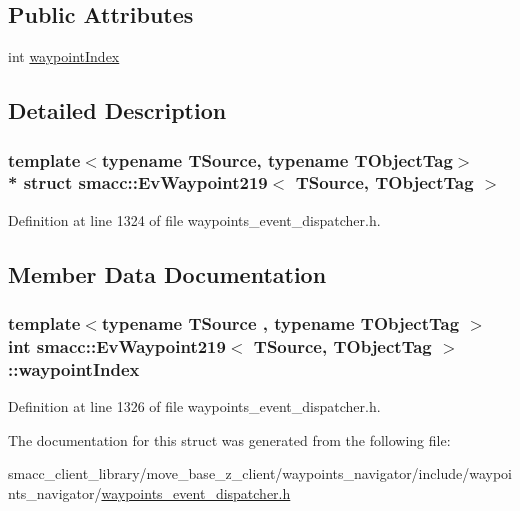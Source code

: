 \subsection*{Public Attributes}
\begin{DoxyCompactItemize}
\item 
int \hyperlink{structsmacc_1_1EvWaypoint219_a29348506b9629774c6495b8c773fcfb3}{waypoint\+Index}
\end{DoxyCompactItemize}


\subsection{Detailed Description}
\subsubsection*{template$<$typename T\+Source, typename T\+Object\+Tag$>$\\*
struct smacc\+::\+Ev\+Waypoint219$<$ T\+Source, T\+Object\+Tag $>$}



Definition at line 1324 of file waypoints\+\_\+event\+\_\+dispatcher.\+h.



\subsection{Member Data Documentation}
\subsubsection[{\texorpdfstring{waypoint\+Index}{waypointIndex}}]{\setlength{\rightskip}{0pt plus 5cm}template$<$typename T\+Source , typename T\+Object\+Tag $>$ int {\bf smacc\+::\+Ev\+Waypoint219}$<$ T\+Source, T\+Object\+Tag $>$\+::waypoint\+Index}\hypertarget{structsmacc_1_1EvWaypoint219_a29348506b9629774c6495b8c773fcfb3}{}\label{structsmacc_1_1EvWaypoint219_a29348506b9629774c6495b8c773fcfb3}


Definition at line 1326 of file waypoints\+\_\+event\+\_\+dispatcher.\+h.



The documentation for this struct was generated from the following file\+:\begin{DoxyCompactItemize}
\item 
smacc\+\_\+client\+\_\+library/move\+\_\+base\+\_\+z\+\_\+client/waypoints\+\_\+navigator/include/waypoints\+\_\+navigator/\hyperlink{waypoints__event__dispatcher_8h}{waypoints\+\_\+event\+\_\+dispatcher.\+h}\end{DoxyCompactItemize}
